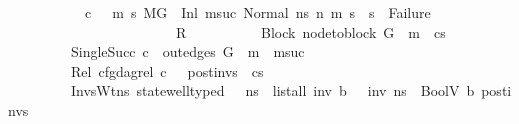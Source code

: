 \begin{isabellebody}
\ \ \ \ \ \ \ \ \ \ \ {\isacharparenleft}{\kern0pt}{\isasymnot}c\ {\isasymLongrightarrow}\ {\isacharparenleft}{\kern0pt}{\isasymAnd}\ m{}{\isacharprime}{\kern0pt}\ s{}{\isacharprime}{\kern0pt}{\isachardot}{\kern0pt}\ {\isacharparenleft}{\kern0pt}{\isacharparenleft}{\kern0pt}M{\isacharcomma}{\kern0pt}{\isasymLambda}{\isacharcomma}{\kern0pt}{\isasymGamma}{\isacharcomma}{\kern0pt}{\isasymOmega}{\isacharcomma}{\kern0pt}G\ {\isasymturnstile}\ {\isacharparenleft}{\kern0pt}Inl\ m{\isacharunderscore}{\kern0pt}suc{\isacharcomma}{\kern0pt}\ Normal\ ns{}{\isacharparenright}{\kern0pt}\ {\isacharminus}{\kern0pt}n{\isasymrightarrow}{\isacharasterisk}{\kern0pt}\ {\isacharparenleft}{\kern0pt}m{}{\isacharprime}{\kern0pt}{\isacharcomma}{\kern0pt}\ s{}{\isacharprime}{\kern0pt}{\isacharparenright}{\kern0pt}{\isacharparenright}{\kern0pt}\ {\isasymLongrightarrow}\ {\isacharparenleft}{\kern0pt}s{}{\isacharprime}{\kern0pt}\ {\isasymnoteq}\ Failure{\isacharparenright}{\kern0pt}{\isacharparenright}{\kern0pt}{\isacharparenright}{\kern0pt}{\isacharparenright}{\kern0pt}{\isasymLongrightarrow}\isanewline
\ \ \ \ \ \ \ \ \ \ \ \ \ \ \ \ \ \ \ \ \ \ \ \ R{\isachardoublequoteclose}\ \isanewline
\ \ \ \ \ \ \ \ \ Block{\isacharcolon}{\kern0pt}\ {\isachardoublequoteopen}node{\isacharunderscore}{\kern0pt}to{\isacharunderscore}{\kern0pt}block\ G\ {\isacharbang}{\kern0pt}\ m\ {\isacharequal}{\kern0pt}\ cs{\isachardoublequoteclose}\ \ \isanewline
\ \ \ \ \ \ \ \ \ SingleSucc{\isacharcolon}{\kern0pt}\ {\isachardoublequoteopen}{\isasymnot}c\ {\isasymLongrightarrow}\ out{\isacharunderscore}{\kern0pt}edges\ G\ {\isacharbang}{\kern0pt}\ m\ {\isacharequal}{\kern0pt}\ {\isacharbrackleft}{\kern0pt}m{\isacharunderscore}{\kern0pt}suc{\isacharbrackright}{\kern0pt}{\isachardoublequoteclose}\ \isanewline
\ \ \ \ \ \ \ \ \ Rel{\isacharcolon}{\kern0pt}\ {\isachardoublequoteopen}cfg{\isacharunderscore}{\kern0pt}dag{\isacharunderscore}{\kern0pt}rel\ c\ {\isacharbrackleft}{\kern0pt}{\isacharbrackright}{\kern0pt}\ {\isacharbrackleft}{\kern0pt}{\isacharbrackright}{\kern0pt}\ post{\isacharunderscore}{\kern0pt}invs\ {\isacharbrackleft}{\kern0pt}{\isacharbrackright}{\kern0pt}\ cs{\isachardoublequoteclose}\ \isanewline
\ \ \ \ \ \ \ \ \ InvsWt{\isacharcolon}{\kern0pt}{\isachardoublequoteopen}{\isasymAnd}ns{\isachardot}{\kern0pt}\ state{\isacharunderscore}{\kern0pt}well{\isacharunderscore}{\kern0pt}typed\ {\isasymLambda}\ {\isasymOmega}\ ns\ {\isasymLongrightarrow}\ list{\isacharunderscore}{\kern0pt}all\ {\isacharparenleft}{\kern0pt}{\isasymlambda}inv{\isachardot}{\kern0pt}\ {\isasymexists}b{\isachardot}{\kern0pt}\ {\isasymLambda}{\isacharcomma}{\kern0pt}{\isasymGamma}{\isacharcomma}{\kern0pt}{\isasymOmega}\ {\isasymturnstile}\ {\isasymlangle}inv{\isacharcomma}{\kern0pt}\ ns{\isasymrangle}\ {\isasymDown}\ BoolV\ b{\isacharparenright}{\kern0pt}\ post{\isacharunderscore}{\kern0pt}invs{\isachardoublequoteclose}\isanewline

\end{isabellebody}
